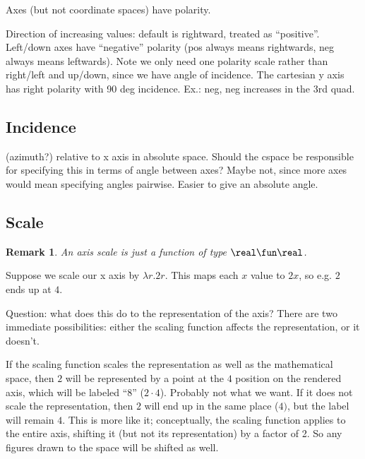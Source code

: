 \documentclass[12pt]{tufte-handout}
\numberwithin{equation}{subsection}
\numberwithin{equation}{subsection}
\newtheorem{remark}{Remark}
\newcommand\cspace{coordinate space}
\begin{document}
  Axes (but not \cspace{}s) have polarity.

  Direction of increasing values: default is rightward, treated as
  ``positive''.  Left/down axes have ``negative'' polarity (pos always
  means rightwards, neg always means leftwards).  Note we only need one
  polarity scale rather than right/left and up/down, since we have angle
  of incidence.  The cartesian y axis has right polarity with 90 deg
  incidence.  Ex.: neg, neg increases in the 3rd quad.

  \subsection{Incidence}
  \label{subs:incidence}

  (azimuth?) relative to x axis in absolute space.
  Should the cspace be responsible for specifying this in terms of
  angle between axes?  Maybe not, since more axes would mean
  specifying angles pairwise.  Easier to give an absolute angle.

  \subsection{Scale}
  \label{subs:axisscale}

  \begin{remark}
    An axis scale is just a function of type \(\real\fun\real\).
  \end{remark}

  Suppose we scale our x axis by \(\lambda r.2r\).  This maps each \(x\)
  value to \(2x\), so e.g. \(2\) ends up at \(4\).

  Question: what does this do to the representation of the axis?  There
  are two immediate possibilities: either the scaling function affects
  the representation, or it doesn't.

  If the scaling function scales the representation as well as the
  mathematical space, then \(2\) will be represented by a point at the \(4\)
  position on the rendered axis, which will be labeled ``8'' (\(2\cdot
  4\)).  Probably not what we want.  If it does not scale the
  representation, then \(2\) will end up in the same place (\(4)\), but
  the label will remain \(4\).  This is more like it; conceptually, the
  scaling function applies to the entire axis, shifting it (but not its
  representation) by a factor of 2.  So any figures drawn to the space
  will be shifted as well.
\end{document}

